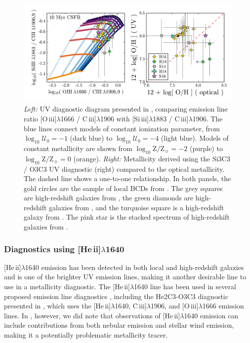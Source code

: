 \documentclass[preprint2]{aastex62}
\newcommand{\oiii}{[O\,{\sc iii}]\xspace}
\newcommand{\heii}{[He\,{\sc ii}]\xspace}
\newcommand{\SiuIII}{[Si\,{\sc iii}]\xspace}
\newcommand{\ciii}{C\,{\sc iii}]\xspace}
\newcommand{\logten}{\ensuremath{\log_{10}}}
\newcommand{\logZeq}[1]{\ensuremath{\logten \mathrm{Z}/\mathrm{Z}_{\sun} = #1}}
\newcommand{\logUeq}[1]{\ensuremath{\logten \mathcal{U}_0 = #1}}
\begin{document}
\begin{figure}
  \begin{center}
    \includegraphics[width=\linewidth]{figs/f3.png}
    \caption{\emph{Left:} UV diagnostic diagram presented in \citet{Byler+2018}, comparing emission line ratio \oiii$\lambda$1666 / \ciii$\lambda$1906 with \SiuIII$\lambda$1883 / \ciii$\lambda$1906. The blue lines connect models of constant ionization parameter, from \logUeq{-1} (dark blue) to \logUeq{-4} (light blue). Models of constant metallicity are shown from \logZeq{-2} (purple) to \logZeq{0} (orange). \emph{Right:} Metallicity derived using the Si3C3 / O3C3 UV diagnostic (right) compared to the optical metallicity. The dashed line shows a one-to-one relationship. In both panels, the gold circles are the sample of local BCDs from \citet{Berg+2016}. The grey squares are high-redshift galaxies from \citet{Stark+2014}, the green diamonds are high-redshift galaxies from \citet{Rigby+2018b}, and the turquoise square is a high-redshift galaxy from \citet{Berg+2018}. The pink star is the stacked spectrum of high-redshift galaxies from \citet{Steidel+2016}.}
    \label{fig:UVC}
  \end{center}
\end{figure}

\subsubsection{Diagnostics using \heii$\lambda$1640}\label{sec:UVOpt:He}

\heii$\lambda$1640 emission has been detected in both local and high-redshift galaxies and is one of the brighter UV emission lines, making it another desirable line to use in a metallicity diagnostic. The \heii$\lambda$1640 line has been used in several proposed emission line diagnostics \citep[e.g.,][]{Jaskot+2016, Feltre+2016}, including the He2C3-O3C3 diagnostic presented in \citet{Byler+2018}, which uses the \heii$\lambda$1640, \ciii$\lambda$1906, and \oiii$\lambda$1666 emission lines. In \citet{Byler+2018}, however, we did note that observations of \heii$\lambda$1640 emission can include contributions from both nebular emission and stellar wind emission, making it a potentially problematic metallicity tracer.
\end{document}
